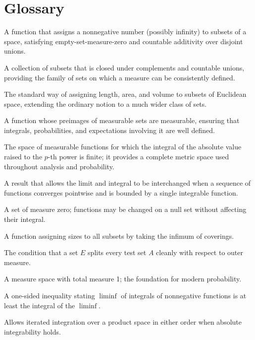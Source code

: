 \section*{Glossary}
\begin{description}[leftmargin=*,style=nextline,itemsep=0.3em]
\item[\textbf{Measure.}] A function that assigns a nonnegative number (possibly infinity) to subsets of a space, satisfying empty-set-measure-zero and countable additivity over disjoint unions.
\item[\textbf{Sigma-algebra.}] A collection of subsets that is closed under complements and countable unions, providing the family of sets on which a measure can be consistently defined.
\item[\textbf{Lebesgue measure.}] The standard way of assigning length, area, and volume to subsets of Euclidean space, extending the ordinary notion to a much wider class of sets.
\item[\textbf{Measurable function.}] A function whose preimages of measurable sets are measurable, ensuring that integrals, probabilities, and expectations involving it are well defined.
\item[\textbf{Lp space.}] The space of measurable functions for which the integral of the absolute value raised to the $p$-th power is finite; it provides a complete metric space used throughout analysis and probability.
\item[\textbf{Dominated convergence theorem.}] A result that allows the limit and integral to be interchanged when a sequence of functions converges pointwise and is bounded by a single integrable function.
\item[\textbf{Null set.}] A set of measure zero; functions may be changed on a null set without affecting their integral.
\item[\textbf{Outer measure.}] A function assigning sizes to all subsets by taking the infimum of coverings.
\item[\textbf{Carath\'eodory criterion.}] The condition that a set $E$ splits every test set $A$ cleanly with respect to outer measure.
\item[\textbf{Probability space.}] A measure space with total measure 1; the foundation for modern probability.
\item[\textbf{Fatou's lemma.}] A one-sided inequality stating $\liminf$ of integrals of nonnegative functions is at least the integral of the $\liminf$.
\item[\textbf{Fubini's theorem.}] Allows iterated integration over a product space in either order when absolute integrability holds.
\end{description}


